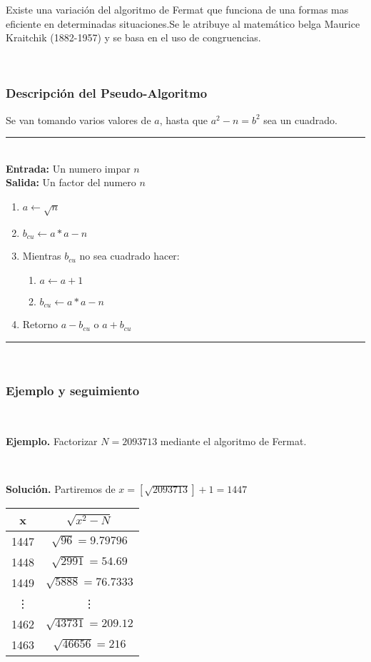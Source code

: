 \documentclass[11pt, conference]{IEEEtran}
\begin{document}
Existe una variación del algoritmo de Fermat que funciona de una formas mas eficiente en determinadas situaciones.Se le atribuye al matemático belga Maurice Kraitchik (1882-1957) y se basa en el uso de congruencias.
   
\
   
\subsubsection[Descripción del Pseudo-Algoritmo]{\textbf{Descripción del Pseudo-Algoritmo}}
Se van tomando varios valores de $a$, hasta que $a^2-n = b^2$ sea un cuadrado.\\
\rule[0mm]{181mm}{0.1mm}\\
\textbf{Entrada:} Un numero impar $n$\\
\textbf{Salida:} Un factor del numero $n$
\begin{enumerate}
	\item $a \leftarrow \sqrt{n}$
	\item $b_{cu} \leftarrow a*a-n$
	\item Mientras $b_{cu}$ no sea cuadrado hacer:
		\begin{enumerate}
			\item $a \leftarrow a+1$
			\item $b_{cu} \leftarrow a*a-n$
		\end{enumerate}
	\item Retorno $a-b_{cu}$ o $a+b_{cu}$ 
\end{enumerate}
\rule[3mm]{181mm}{0.1mm}

\

\subsubsection[Ejemplo y seguimiento]{\textbf{Ejemplo y seguimiento}}

\

\textbf{Ejemplo.} Factorizar $N = 2093713$ mediante el algoritmo de Fermat.

\

\textbf{Solución.} Partiremos de $x=[\sqrt{2093713}]+1=1447$

\begin{table}[htb]
	\begin{center}
		\begin{tabular}{|c|c|}
			\hline	
			\textbf{x}& \textbf{$\sqrt{x^2-N}$}\\
			\hline
			1447 & $\sqrt{96} = 9.79796$\\ \hline
			1448 & $\sqrt{2991} = 54.69$\\ \hline
			1449 & $\sqrt{5888} = 76.7333$\\ \hline
			\vdots &\vdots \\ \hline
			1462 & $\sqrt{43731} = 209.12$\\ \hline
			1463 & $\sqrt{46656} = 216$\\ \hline
		\end{tabular}
	\end{center}
\end{table}
\pagebreak
\end{document}

